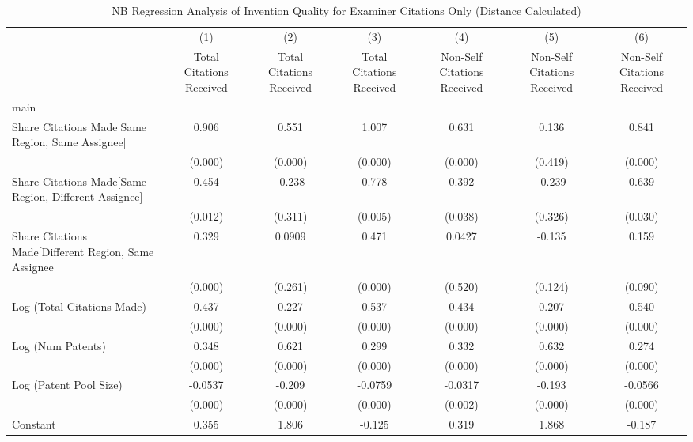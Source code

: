 \begin{table}[htbp]\centering
\caption{NB Regression Analysis of Invention Quality for Examiner Citations Only (Distance Calculated) \label{e.model123192021}}
\begin{tabular}{l*{6}{c}}
\hline\hline
                &\multicolumn{1}{c}{(1)}&\multicolumn{1}{c}{(2)}&\multicolumn{1}{c}{(3)}&\multicolumn{1}{c}{(4)}&\multicolumn{1}{c}{(5)}&\multicolumn{1}{c}{(6)}\\
                &\multicolumn{1}{c}{Total Citations Received}&\multicolumn{1}{c}{Total Citations Received}&\multicolumn{1}{c}{Total Citations Received}&\multicolumn{1}{c}{Non-Self Citations Received}&\multicolumn{1}{c}{Non-Self Citations Received}&\multicolumn{1}{c}{Non-Self Citations Received}\\
\hline
main            &         &         &         &         &         &         \\
Share Citations Made[Same Region, Same Assignee]&    0.906&    0.551&    1.007&    0.631&    0.136&    0.841\\
                &  (0.000)&  (0.000)&  (0.000)&  (0.000)&  (0.419)&  (0.000)\\
Share Citations Made[Same Region, Different Assignee]&    0.454&   -0.238&    0.778&    0.392&   -0.239&    0.639\\
                &  (0.012)&  (0.311)&  (0.005)&  (0.038)&  (0.326)&  (0.030)\\
Share Citations Made[Different Region, Same Assignee]&    0.329&   0.0909&    0.471&   0.0427&   -0.135&    0.159\\
                &  (0.000)&  (0.261)&  (0.000)&  (0.520)&  (0.124)&  (0.090)\\
Log (Total Citations Made)&    0.437&    0.227&    0.537&    0.434&    0.207&    0.540\\
                &  (0.000)&  (0.000)&  (0.000)&  (0.000)&  (0.000)&  (0.000)\\
Log (Num Patents)&    0.348&    0.621&    0.299&    0.332&    0.632&    0.274\\
                &  (0.000)&  (0.000)&  (0.000)&  (0.000)&  (0.000)&  (0.000)\\
Log (Patent Pool Size)&  -0.0537&   -0.209&  -0.0759&  -0.0317&   -0.193&  -0.0566\\
                &  (0.000)&  (0.000)&  (0.000)&  (0.002)&  (0.000)&  (0.000)\\
Constant        &    0.355&    1.806&   -0.125&    0.319&    1.868&   -0.187\\

\end{tabular}
\end{table}
